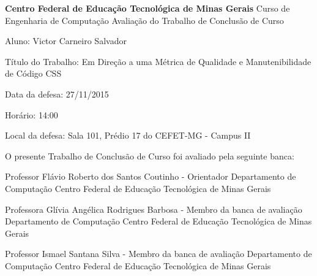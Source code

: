 \makeatletter
\begin{folhadeaprovacao}
	\begin{center}
		\textbf{Centro Federal de Educação Tecnológica de Minas Gerais}
		\newline \newline
		Curso de Engenharia de Computação
		\newline \newline
		Avaliação do Trabalho de Conclusão de Curso
	\end{center}
	
	\hfill \break
	\hfill \break
	\noindent Aluno: Victor Carneiro Salvador
	
	\noindent Título do Trabalho: Em Direção a uma Métrica de Qualidade e Manutenibilidade de Código CSS
	
	\noindent Data da defesa: 27/11/2015
	
	\noindent Horário: 14:00
	
	\noindent Local da defesa: Sala 101, Prédio 17 do CEFET-MG - Campus II
	\hfill \break
	\newline
	\begin{center}
	O  presente Trabalho de Conclusão de Curso foi avaliado pela seguinte banca:\newline \newline
	
	Professor Flávio Roberto dos Santos Coutinho - Orientador \newline
	Departamento de Computação \newline
	Centro Federal de Educação Tecnológica de Minas Gerais \newline \newline
	
	Professora Glívia Angélica Rodrigues Barbosa - Membro da banca de avaliação \newline
	Departamento de Computação \newline
	Centro Federal de Educação Tecnológica de Minas Gerais \newline \newline
	
	Professor Ismael Santana Silva - Membro da banca de avaliação \newline
	Departamento de Computação \newline
	Centro Federal de Educação Tecnológica de Minas Gerais \newline \newline
	
	\end{center}
\end{folhadeaprovacao}